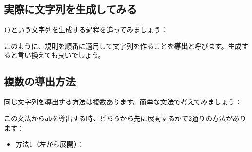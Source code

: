 \hypertarget{chapter4-ux5b9fux969bux306bux6587ux5b57ux5217ux3092ux751fux6210ux3057ux3066ux307fux308b}{%
\subsection{実際に文字列を生成してみる}\label{chapter4-ux5b9fux969bux306bux6587ux5b57ux5217ux3092ux751fux6210ux3057ux3066ux307fux308b}}

\texttt{()}という文字列を生成する過程を追ってみましょう：

\begin{Shaded}
\begin{Highlighting}[]
\end{Highlighting}
\end{Shaded}

このように、規則を順番に適用して文字列を作ることを\textbf{導出}と呼びます。生成すると言い換えても良いでしょう。

\hypertarget{chapter4-ux8907ux6570ux306eux5c0eux51faux65b9ux6cd5}{%
\subsection{複数の導出方法}\label{chapter4-ux8907ux6570ux306eux5c0eux51faux65b9ux6cd5}}

同じ文字列を導出する方法は複数あります。簡単な文法で考えてみましょう：

\begin{Shaded}
\begin{Highlighting}[]
\end{Highlighting}
\end{Shaded}

この文法から\texttt{ab}を導出する時、どちらから先に展開するかで2通りの方法があります：

\begin{itemize}
\tightlist
\item
  方法1（左から展開）：
\end{itemize}

\begin{Shaded}
\begin{Highlighting}[]
\end{Highlighting}
\end{Shaded}

